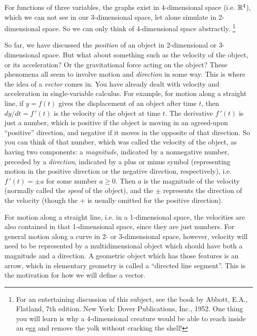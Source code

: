 For functions of three variables, the graphs exist in 4-dimensional space (i.e. $\mathbb{R}^{4}$),
which we can not see in our 3-dimensional space, let alone simulate in 2-dimensional space.  So we
can only think of 4-dimensional space abstractly.  \footnote{For an entertaining discussion of this subject, see the book by
Abbott, E.A., Flatland, 7th edition. New York: Dover Publications, Inc., 1952. One thing you will learn is why a 4-dimensional creature would be able to reach inside an egg and
remove the yolk without cracking the shell!}

So far, we have discussed the \emph{position} of an object in 2-dimensional or 3-dimensional space.
But what about something such as the velocity of the object, or its acceleration?
Or the gravitational force acting on the object? These phenomena all seem to involve motion and \emph{direction} in some
way.  This is where the idea of a \emph{vector} comes in.
\newpage
You have already dealt with velocity and acceleration in single-variable calculus.  For example, for motion along a
straight line, if $y = f(t)$ gives the displacement of an object after time $t$, then $dy/dt = f\,'(t)$ is the velocity
of the object at time $t$.  The derivative
$f\,'(t)$ is just a number, which is positive if the object is moving in an
agreed-upon ``positive'' direction, and negative if it moves in the opposite of that direction. So you can think of
that number, which was called the velocity of the object, as having two components: a \emph{magnitude}, indicated by
a nonnegative number, preceded by a \emph{direction}, indicated by a plus or minus symbol (representing motion in the
positive direction or the negative direction, respectively), i.e. $f\,'(t) = \pm a$ for some number $a \ge 0$.  Then
$a$ is the magnitude of the velocity (normally called the \emph{speed} of the object), and the $\pm$ represents the
direction of the velocity (though the $+$ is usually omitted for the positive direction).

For motion along a straight line, i.e. in a 1-dimensional space, the velocities are also contained in that
1-dimensional space, since they are just numbers.  For general motion along a curve in 2- or 3-dimensional space,
however, velocity will need to be represented by a multidimensional object which should have both a magnitude and a
direction.  A geometric object which has those features is an arrow, which in elementary geometry is called a
``directed line segment''.  This is the motivation for how we will define a vector.

